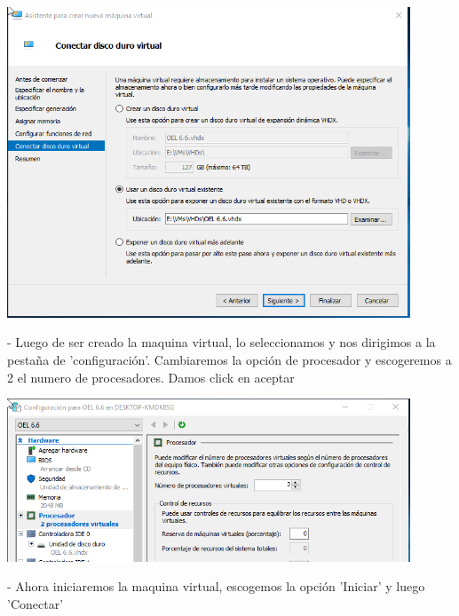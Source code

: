 \documentclass[12pt,letterpaper]{article}
\begin{document}
\begin{center}
	\includegraphics[width=12cm]{./Imagenes/11} 
\end{center}


\begin{itemize}
- Luego de ser creado la maquina virtual, lo seleccionamos y nos dirigimos a la pestaña de 'configuración'. Cambiaremos la opción de procesador y escogeremos a 2 el numero de procesadores. Damos click en aceptar\\
\end{itemize}

\begin{center}
	\includegraphics[width=12cm]{./Imagenes/12} 
\end{center}


\begin{itemize}
- Ahora iniciaremos la maquina virtual, escogemos la opción 'Iniciar' y luego 'Conectar'\\
\end{itemize}
\end{document}
